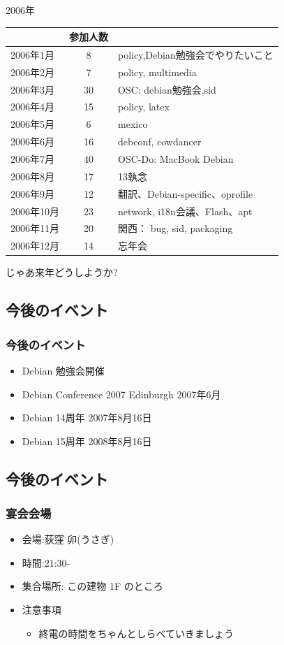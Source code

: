 \documentclass[cjk,dvipdfmx]{beamer}
\begin{document}
\begin{frame}{2006年}
   \begin{tabular}{|l|c|l|}
 \hline
 & 参加人数 & \\
 \hline
 2006年1月 & 8 & policy,Debian勉強会でやりたいこと\\
 2006年2月 & 7 & policy, multimedia \\
 2006年3月 & 30 & OSC: debian勉強会,sid \\
 2006年4月 & 15 & policy, latex \\
 2006年5月 & 6 & mexico \\
 2006年6月 & 16 & debconf, cowdancer\\
 2006年7月 & 40 & OSC-Do: MacBook Debian \\
 2006年8月 & 17 & 13執念 \\
 2006年9月 & 12 & 翻訳、Debian-specific、oprofile \\
 2006年10月 & 23 & network, i18n会議、Flash、apt \\
 2006年11月 & 20 & 関西： bug, sid, packaging \\
 2006年12月 & 14 & 忘年会 \\
 \hline
  \end{tabular}
\end{frame}

\begin{frame}
じゃあ来年どうしようか? 
\end{frame}

\subsection{今後のイベント}

\begin{frame}
 \frametitle{今後のイベント}
 \begin{itemize}
  \item Debian 勉強会開催
  \item Debian Conference 2007 Edinburgh 2007年6月
  \item Debian 14周年 2007年8月16日
  \item Debian 15周年 2008年8月16日
 \end{itemize}
\end{frame}

\subsection{今後のイベント}

\begin{frame}
 \frametitle{宴会会場}
 \begin{itemize}
  \item 会場:荻窪 卯(うさぎ)
  \item 時間:21:30-
  \item 集合場所: この建物 1F のところ
  \item 注意事項
	\begin{itemize}
	 \item 終電の時間をちゃんとしらべていきましょう
	\end{itemize}
 \end{itemize}
\end{frame}
\end{document}
